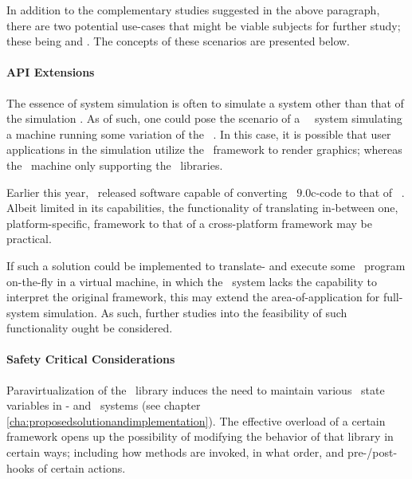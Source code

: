 \noindent
In addition to the complementary studies suggested in the above paragraph, there are two potential use-cases that might be viable subjects for further study; these being  and .
The concepts of these scenarios are presented below.

\paragraph{API Extensions}
\label{par:futurework_apiextensions}
The essence of system simulation is often to simulate a system other than that of the simulation \dvttermhost .
As of such, one could pose the scenario of a \dvttermlinux\ \dvttermhost\ system simulating a machine running some variation of the \dvttermwindows\ \dvttermos .
In this case, it is possible that user applications in the simulation utilize the \dvttermdirectx\ framework to render graphics; whereas the \dvttermhost\ machine only supporting the \dvttermopengl\ libraries.

Earlier this year, \dvttermvalve\ released software capable of converting \dvttermdirectx\ $9.0$c-code to that of \dvttermopengl ~.
Albeit limited in its capabilities, the functionality of translating in-between one, platform-specific, framework to that of a cross-platform framework may be practical.

If such a solution could be implemented to translate- and execute some \dvttermtarget\ program on-the-fly in a virtual machine, in which the \dvttermhost\ system lacks the capability to interpret the original framework, this may extend the area-of-application for full-system simulation.
As such, further studies into the feasibility of such functionality ought be considered.

\paragraph{Safety Critical Considerations}
\label{par:futurework_safetycriticalconsiderations}
Paravirtualization of the \dvttermopenglestwopointo\ library induces the need to maintain various \dvttermopengl\ state variables in \dvttermtarget - and \dvttermhost\ systems (see chapter \ref{cha:proposedsolutionandimplementation}).
The effective overload of a certain framework opens up the possibility of modifying the behavior of that library in certain ways; including how methods are invoked, in what order, and pre-/post-hooks of certain actions.

